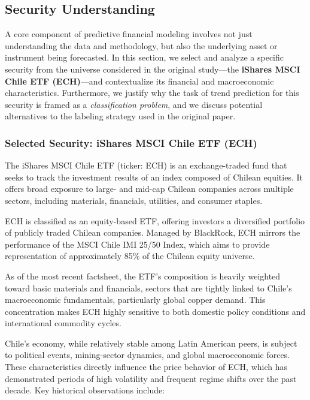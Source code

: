 \subsection{Security Understanding}

A core component of predictive financial modeling involves not just understanding the data and methodology, but also the underlying asset or instrument being forecasted. In this section, we select and analyze a specific security from the universe considered in the original study—the \textbf{iShares MSCI Chile ETF (ECH)}—and contextualize its financial and macroeconomic characteristics. Furthermore, we justify why the task of trend prediction for this security is framed as a \textit{classification problem}, and we discuss potential alternatives to the labeling strategy used in the original paper.

\subsubsection{Selected Security: iShares MSCI Chile ETF (ECH)}

The iShares MSCI Chile ETF (ticker: ECH) is an exchange-traded fund that seeks to track the investment results of an index composed of Chilean equities. It offers broad exposure to large- and mid-cap Chilean companies across multiple sectors, including materials, financials, utilities, and consumer staples.

ECH is classified as an equity-based ETF, offering investors a diversified portfolio of publicly traded Chilean companies. Managed by BlackRock, ECH mirrors the performance of the MSCI Chile IMI 25/50 Index, which aims to provide representation of approximately 85\% of the Chilean equity universe.

As of the most recent factsheet, the ETF’s composition is heavily weighted toward basic materials and financials, sectors that are tightly linked to Chile's macroeconomic fundamentals, particularly global copper demand. This concentration makes ECH highly sensitive to both domestic policy conditions and international commodity cycles.

Chile’s economy, while relatively stable among Latin American peers, is subject to political events, mining-sector dynamics, and global macroeconomic forces. These characteristics directly influence the price behavior of ECH, which has demonstrated periods of high volatility and frequent regime shifts over the past decade. Key historical observations include:

